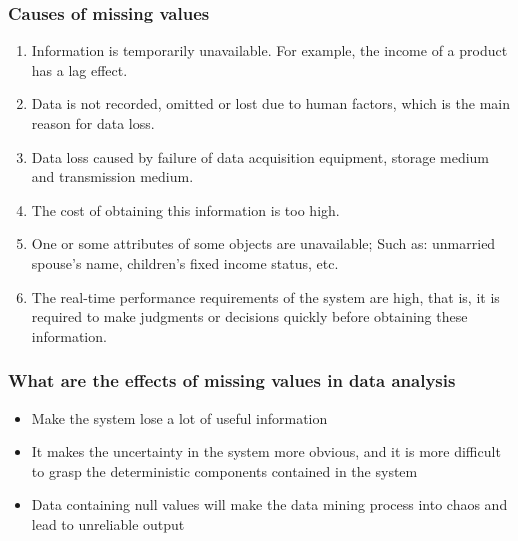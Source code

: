 \subsubsection{Causes of missing values}
\begin{enumerate}

\item Information is temporarily unavailable. For example, the income of a product has a lag effect.

\item Data is not recorded, omitted or lost due to human factors, which is the main reason for data loss.

\item Data loss caused by failure of data acquisition equipment, storage medium and transmission medium.

\item The cost of obtaining this information is too high.

\item One or some attributes of some objects are unavailable; Such as: unmarried spouse's name, children's fixed income status, etc.

\item The real-time performance requirements of the system are high, that is, it is required to make judgments or decisions quickly before obtaining these information.
\end{enumerate}

\subsubsection{What are the effects of missing values in data analysis}
\begin{itemize}
\item Make the system lose a lot of useful information
\item It makes the uncertainty in the system more obvious, and it is more difficult to grasp the deterministic components contained in the system
\item Data containing null values will make the data mining process into chaos and lead to unreliable output
\end{itemize}
